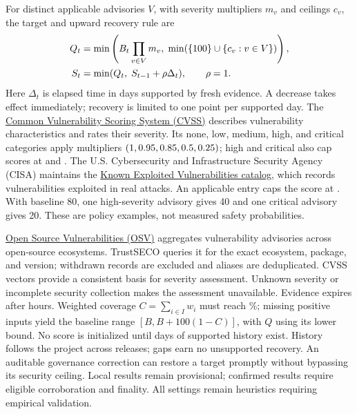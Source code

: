 \documentclass[10pt,conference]{IEEEtran}
\begin{document}
For distinct applicable advisories $V$, with severity multipliers $m_v$ and ceilings $c_v$, the target and upward recovery rule are
\begin{equation}
\begin{aligned}
 Q_t&=\min\left(B_t\prod_{v\in V}m_v,\;\min(\{100\}\cup\{c_v:v\in V\})\right),\\
 S_t&=\min(Q_t,\;S_{t-1}+\rho\Delta_t),\qquad \rho=1.
\end{aligned}
\label{eq:score}
\end{equation}
Here $\Delta_t$ is elapsed time in days supported by fresh evidence. A decrease takes effect immediately; recovery is limited to one point per supported day. The \href{https://www.first.org/cvss/v4.0/specification-document}{Common Vulnerability Scoring System (CVSS)} describes vulnerability characteristics and rates their severity. Its none, low, medium, high, and critical categories apply multipliers $(1,0.95,0.85,0.5,0.25)$; high and critical also cap scores at \TrustHighCap{} and \TrustCriticalCap{}. The U.S. Cybersecurity and Infrastructure Security Agency (CISA) maintains the \href{https://www.cisa.gov/known-exploited-vulnerabilities-catalog}{Known Exploited Vulnerabilities catalog}, which records vulnerabilities exploited in real attacks. An applicable entry caps the score at \TrustExploitedCap{}. With baseline 80, one high-severity advisory gives 40 and one critical advisory gives 20. These are policy examples, not measured safety probabilities.

\href{https://osv.dev/}{Open Source Vulnerabilities (OSV)} aggregates vulnerability advisories across open-source ecosystems. TrustSECO queries it for the exact ecosystem, package, and version; withdrawn records are excluded and aliases are deduplicated. CVSS vectors provide a consistent basis for severity assessment. Unknown severity or incomplete security collection makes the assessment unavailable. Evidence expires after \TrustFreshness{} hours. Weighted coverage $C=\sum_{i\in I}w_i$ must reach \TrustCoverage\%; missing positive inputs yield the baseline range $[B,B+100(1-C)]$, with $Q$ using its lower bound. No score is initialized until \TrustHistory{} days of supported history exist. History follows the project across releases; gaps earn no unsupported recovery. An auditable governance correction can restore a target promptly without bypassing its security ceiling. Local results remain provisional; confirmed results require eligible corroboration and finality. All settings remain heuristics requiring empirical validation.
\end{document}
